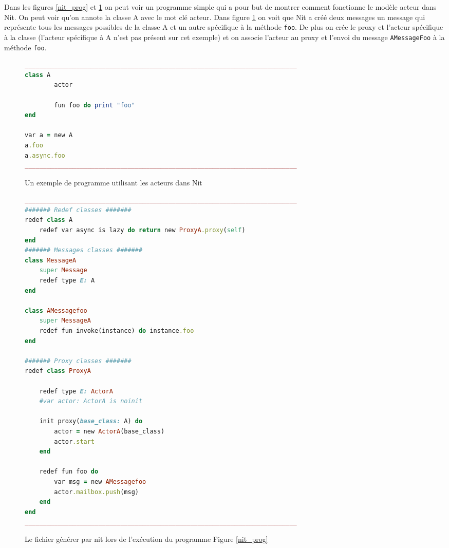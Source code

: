 \documentclass[11pt, a4paper]{article}
\begin{document}
Dans les figures \ref{nit_prog} et \ref{nit_prog_gen} on peut voir un programme simple qui a pour but de montrer comment fonctionne le modèle acteur dans Nit. On peut voir qu'on annote la classe A avec le mot clé acteur. Dans figure \ref{nit_prog_gen} on voit que Nit a créé deux messages un message qui représente tous les messages possibles de la classe A et un autre spécifique à la méthode \texttt{foo}. De plus on crée le proxy et l'acteur spécifique à la classe (l'acteur spécifique à A n'est pas présent sur cet exemple) et on associe l'acteur au proxy et l'envoi du message \texttt{AMessageFoo} à la méthode \texttt{foo}.

\begin{figure}
\centering
\begin{minipage}{.5\textwidth}
  \centering
  \begin{lstlisting}[language=ruby]
__________________________________________________________________________
class A 
        actor

        fun foo do print "foo"
end

var a = new A
a.foo
a.async.foo
__________________________________________________________________________
\end{lstlisting}
  \caption{Un exemple de programme utilisant les acteurs dans Nit}
  \label{nit_prog}
\end{minipage}%
\begin{minipage}{.5\textwidth}
  \centering
\begin{lstlisting}[language=ruby]
__________________________________________________________________________
####### Redef classes #######
redef class A
	redef var async is lazy do return new ProxyA.proxy(self)
end
####### Messages classes #######
class MessageA
	super Message
	redef type E: A
end

class AMessagefoo
	super MessageA
	redef fun invoke(instance) do instance.foo
end

####### Proxy classes #######
redef class ProxyA

	redef type E: ActorA
	#var actor: ActorA is noinit

	init proxy(base_class: A) do
		actor = new ActorA(base_class)
		actor.start
	end

	redef fun foo do
		var msg = new AMessagefoo
		actor.mailbox.push(msg)
	end
end
__________________________________________________________________________
\end{lstlisting} 
\caption{Le fichier générer par nit lors de l'exécution du programme Figure \ref{nit_prog}}
  \label{nit_prog_gen}
\end{minipage}
\end{figure}
\end{document}
